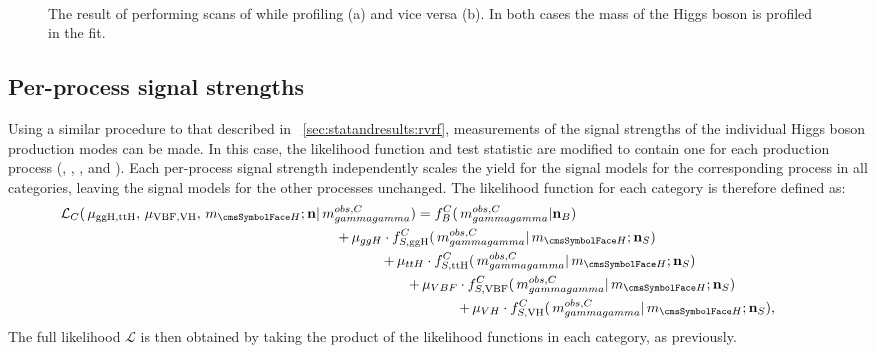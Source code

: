 \begin{figure}[hpt!]
\centering
{} \\
\caption{The result of performing \DNLL scans of \muF while profiling \muV (a) and vice versa (b). In both cases the mass of the Higgs boson is profiled in the fit. }

\label{fig:statandresults:mu_per_rv_and_rf}

\end{figure}

\subsection{Per-process signal strengths}
\label{sec:statandresults:mu_per_proc}

Using a similar procedure to that described in \Sec~\ref{sec:statandresults:rvrf}, measurements of the signal strengths of the individual Higgs boson production modes can be made. In this case, the likelihood function and test statistic are modified to contain one \POI for each production process (\muggH, \muVBF, \muVH, and \muttH). Each per-process signal strength independently scales the yield for the signal models for the corresponding process in all categories, leaving the signal models for the other processes unchanged. The likelihood function for each category is therefore defined as: 
\begin{equation}
\label{eq:statandresults:likelihood_function_muProc}
\begin{split} \mathcal{L}_C(\muF, \muV, \mH; \mathbf{n} | \mgg^{obs,C} ) = f^C_B(\mgg^{obs,C} | \mathbf{n}_B )\hspace{6cm}  \\ 
+\muggH \cdot  f^C_{S,{\text{ggH}}}(\mgg^{obs,C} |\mH ; \mathbf{n}_S) \hspace{4cm} \\ 
+\muttH \cdot f^C_{S,{\text{ttH}}}(\mgg^{obs,C} |\mH ; \mathbf{n}_S) \hspace{3cm}  \\  
+ \muVBF \cdot  f^C_{S,{\text{VBF}}}(\mgg^{obs,C} |\mH ; \mathbf{n}_S) \hspace{2cm} \\
+  \muVH \cdot f^C_{S,{\text{VH}}}(\mgg^{obs,C} |\mH ; \mathbf{n}_S),  \hspace{1cm} \\  
\end{split} 
\end{equation}
The full likelihood $\mathcal{L}$ is then obtained by taking the product of the likelihood functions in each category, as previously.

